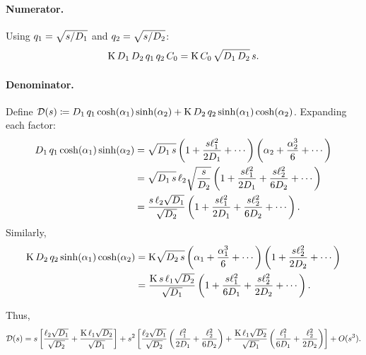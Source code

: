 \paragraph{Numerator.} Using $q_1 = \sqrt{s/D_{1}}$ and
$q_2 = \sqrt{s/D_{2}}$:
\begin{equation}
  \mathrm{K}\,D_{1}\,D_{2}\,q_1\,q_2\,C_0
  = \mathrm{K}\,C_0\,\sqrt{D_{1}\,D_{2}}\,s.
\end{equation}

\paragraph{Denominator.} Define
$\mathcal{D}(s) \coloneqq D_{1}\,q_1\cosh(\alpha_1)\sinh(\alpha_2)
+ \mathrm{K}\,D_{2}\,q_2\sinh(\alpha_1)\cosh(\alpha_2)$.
Expanding each factor:
\begin{align}
  D_{1}\,q_1\cosh(\alpha_1)\sinh(\alpha_2)
  &= \sqrt{D_{1}\,s}\left(1 + \frac{s\ell_{1}^2}{2D_{1}}
    + \cdots\right)
    \left(\alpha_2 + \frac{\alpha_2^3}{6} + \cdots\right)
  \notag\\
  &= \sqrt{D_{1}\,s}\,\ell_{2}\sqrt{\frac{s}{D_{2}}}
    \left(1 + \frac{s\ell_{1}^2}{2D_{1}}
    + \frac{s\ell_{2}^2}{6D_{2}} + \cdots\right)
  \notag\\
  &= \frac{s\,\ell_{2}\sqrt{D_{1}}}{\sqrt{D_{2}}}
    \left(1 + \frac{s\ell_{1}^2}{2D_{1}}
    + \frac{s\ell_{2}^2}{6D_{2}} + \cdots\right).
\end{align}
Similarly,
\begin{align}
  \mathrm{K}\,D_{2}\,q_2\sinh(\alpha_1)\cosh(\alpha_2)
  &= \mathrm{K}\sqrt{D_{2}\,s}
    \left(\alpha_1 + \frac{\alpha_1^3}{6} + \cdots\right)
    \left(1 + \frac{s\ell_{2}^2}{2D_{2}} + \cdots\right)
  \notag\\
  &= \frac{\mathrm{K}\,s\,\ell_{1}\sqrt{D_{2}}}{\sqrt{D_{1}}}
    \left(1 + \frac{s\ell_{1}^2}{6D_{1}}
    + \frac{s\ell_{2}^2}{2D_{2}} + \cdots\right).
\end{align}

Thus,
\begin{equation}
  \label{eq:denom-expanded}
  \mathcal{D}(s) = s\left[\frac{\ell_{2}\sqrt{D_{1}}}{\sqrt{D_{2}}}
    + \frac{\mathrm{K}\,\ell_{1}\sqrt{D_{2}}}{\sqrt{D_{1}}}\right]
    + s^2\left[\frac{\ell_{2}\sqrt{D_{1}}}{\sqrt{D_{2}}}
    \left(\frac{\ell_{1}^2}{2D_{1}} + \frac{\ell_{2}^2}{6D_{2}}\right)
    + \frac{\mathrm{K}\,\ell_{1}\sqrt{D_{2}}}{\sqrt{D_{1}}}
    \left(\frac{\ell_{1}^2}{6D_{1}} + \frac{\ell_{2}^2}{2D_{2}}\right)
    \right] + O(s^3).
\end{equation}

